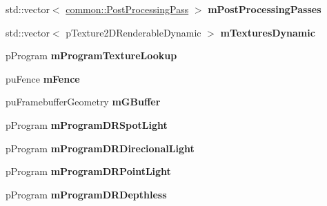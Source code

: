 \begin{DoxyCompactItemize}
\item 
\hypertarget{structfillwave_1_1Engine_1_1EngineImpl_ab83af8dffddf67dd50a37dd1590baf18}{}std\+::vector$<$ \hyperlink{classfillwave_1_1common_1_1PostProcessingPass}{common\+::\+Post\+Processing\+Pass} $>$ {\bfseries m\+Post\+Processing\+Passes}\label{structfillwave_1_1Engine_1_1EngineImpl_ab83af8dffddf67dd50a37dd1590baf18}

\item 
\hypertarget{structfillwave_1_1Engine_1_1EngineImpl_ac1231a2a86b2c3cfe8b9f7b9440f89bf}{}std\+::vector$<$ p\+Texture2\+D\+Renderable\+Dynamic $>$ {\bfseries m\+Textures\+Dynamic}\label{structfillwave_1_1Engine_1_1EngineImpl_ac1231a2a86b2c3cfe8b9f7b9440f89bf}

\item 
\hypertarget{structfillwave_1_1Engine_1_1EngineImpl_a2e5b973e0fdb2a12228ab29291f2baf6}{}p\+Program {\bfseries m\+Program\+Texture\+Lookup}\label{structfillwave_1_1Engine_1_1EngineImpl_a2e5b973e0fdb2a12228ab29291f2baf6}

\item 
\hypertarget{structfillwave_1_1Engine_1_1EngineImpl_a7a30b84cb2c3ad1e49c918dc5b6335ef}{}pu\+Fence {\bfseries m\+Fence}\label{structfillwave_1_1Engine_1_1EngineImpl_a7a30b84cb2c3ad1e49c918dc5b6335ef}

\item 
\hypertarget{structfillwave_1_1Engine_1_1EngineImpl_a6ec45f07412f6770a7075286dd8349f2}{}pu\+Framebuffer\+Geometry {\bfseries m\+G\+Buffer}\label{structfillwave_1_1Engine_1_1EngineImpl_a6ec45f07412f6770a7075286dd8349f2}

\item 
\hypertarget{structfillwave_1_1Engine_1_1EngineImpl_ae7d51a4fba6bdedeccd1e41cfca3a60a}{}p\+Program {\bfseries m\+Program\+D\+R\+Spot\+Light}\label{structfillwave_1_1Engine_1_1EngineImpl_ae7d51a4fba6bdedeccd1e41cfca3a60a}

\item 
\hypertarget{structfillwave_1_1Engine_1_1EngineImpl_a8dbbb4680f6a462c11d5201b9431043c}{}p\+Program {\bfseries m\+Program\+D\+R\+Direcional\+Light}\label{structfillwave_1_1Engine_1_1EngineImpl_a8dbbb4680f6a462c11d5201b9431043c}

\item 
\hypertarget{structfillwave_1_1Engine_1_1EngineImpl_ada796d07813b6976c5a31ca6ebe8b95d}{}p\+Program {\bfseries m\+Program\+D\+R\+Point\+Light}\label{structfillwave_1_1Engine_1_1EngineImpl_ada796d07813b6976c5a31ca6ebe8b95d}

\item 
\hypertarget{structfillwave_1_1Engine_1_1EngineImpl_ae187ee4233ba11d01ca6c553ffb0a292}{}p\+Program {\bfseries m\+Program\+D\+R\+Depthless}\label{structfillwave_1_1Engine_1_1EngineImpl_ae187ee4233ba11d01ca6c553ffb0a292}


\end{DoxyCompactItemize}
